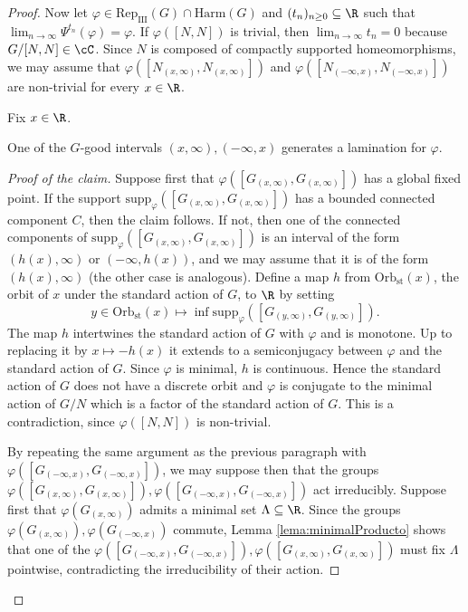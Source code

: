 \documentclass[reqno]{amsart}
\begin{document}
\begin{proof}
Now let $\varphi \in \mathrm{Rep}_\mathrm{III}(G) \cap \mathrm{Harm}(G)$ and $(t_n)_{n \geq 0} \subseteq \R$ such that $\lim_{n \to \infty} \Psi^{t_n}(\varphi) = \varphi$. If $\varphi([N,N])$ is trivial, then $\lim_{n \to \infty} t_n = 0$ because $G/[N,N] \in \cC$. Since $N$ is composed of compactly supported homeomorphisms, we may assume that $\varphi([N_{(x, \infty)}, N_{(x, \infty)}])$ and $\varphi([N_{(-\infty, x)}, N_{(-\infty, x)}])$ are non-trivial for every $x \in \R$. 

Fix $x \in \R$.
\begin{claimnum}
One of the $G$-good intervals $(x, \infty), (-\infty, x)$ generates a lamination for $\varphi$.
\end{claimnum}
\begin{proof}[Proof of the claim]
Suppose first that $\varphi([G_{(x, \infty)}, G_{(x, \infty)}])$ has a global fixed point. If the support $\mathrm{supp}_\varphi([G_{(x, \infty)}, G_{(x, \infty)}])$ has a bounded connected component $C$, then the claim follows. If not, then one of the connected components of $\mathrm{supp}_\varphi([G_{(x, \infty)}, G_{(x, \infty)}])$ is an interval of the form $(h(x), \infty)$ or $(-\infty, h(x))$, and we may assume that it is of the form $(h(x),\infty)$ (the other case is analogous). Define a map $h$ from $\mathrm{Orb}_\mathrm{st}(x)$, the orbit of $x$ under the standard action of $G$, to $\R$ by setting
\[
	y \in \mathrm{Orb}_\mathrm{st}(x) \mapsto \inf \mathrm{supp}_\varphi([G_{(y, \infty)}, G_{(y, \infty)}]).
\]
The map $h$ intertwines the standard action of $G$ with $\varphi$ and is monotone. Up to replacing it by $x \mapsto -h(x)$ it extends to a semiconjugacy between $\varphi$ and the standard action of $G$. Since $\varphi$ is minimal, $h$ is continuous. Hence the standard action of $G$ does not have a discrete orbit and $\varphi$ is conjugate to the minimal action of $G/N$ which is a factor of the standard action of $G$. This is a contradiction, since $\varphi([N,N])$ is non-trivial.

By repeating the same argument as the previous paragraph with $\varphi([G_{(-\infty, x)}, G_{(-\infty, x)}])$, we may suppose then that the groups $\varphi([G_{(x, \infty)}, G_{(x, \infty)}]),  \varphi([G_{(-\infty, x)}, G_{(-\infty, x)}])$ act irreducibly. Suppose first that $\varphi(G_{(x, \infty)})$ admits a minimal set $\Lambda \subseteq \R$. Since the groups $\varphi(G_{(x, \infty)}), \varphi(G_{(-\infty, x)})$ commute, Lemma \ref{lema:minimalProducto} shows that one of the $\varphi([G_{(-\infty, x)}, G_{(-\infty, x)}]), \varphi([G_{(x, \infty)}, G_{(x, \infty)}])$ must fix $\Lambda$ pointwise, contradicting the irreducibility of their action. 


\end{proof}
\end{proof}
\end{document}
